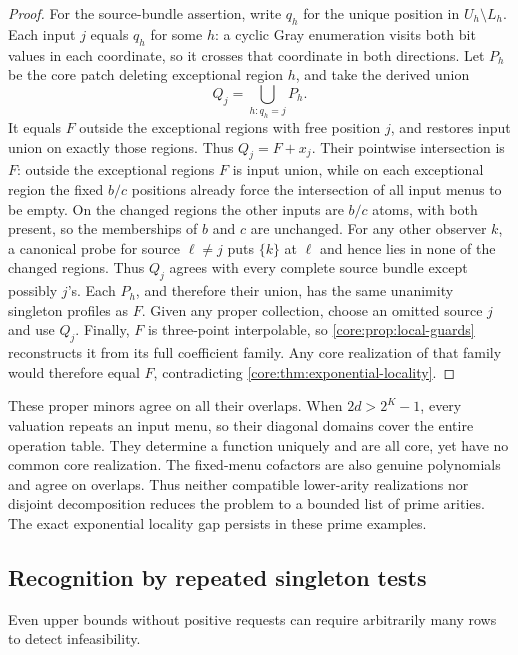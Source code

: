 \begin{proof}
For the source-bundle assertion, write $q_h$ for the unique position in
$U_h\setminus L_h$. Each input $j$ equals $q_h$ for some $h$: a cyclic
Gray enumeration visits both bit values in each coordinate, so it crosses
that coordinate in both directions. Let $P_h$ be the core patch deleting
exceptional region $h$, and take the derived union
\[
 Q_j=\bigcup_{h:q_h=j}P_h.
\]
It equals $F$ outside the exceptional regions with free position $j$,
and restores input union on exactly those regions. Thus $Q_j=F+x_j$.
Their pointwise intersection is $F$: outside the exceptional regions
$F$ is input union, while on each exceptional region the fixed $b/c$
positions already force the intersection of all input menus to be empty.
On the changed regions the
other inputs are $b/c$ atoms, with both present, so the memberships of $b$
and $c$ are unchanged. For any other observer $k$, a canonical probe for
source $\ell\ne j$ puts $\{k\}$ at $\ell$ and hence lies in none of
the changed regions. Thus $Q_j$ agrees with every complete source bundle
except possibly $j$'s. Each $P_h$, and therefore their union, has the same
unanimity singleton profiles as $F$. Given any proper collection, choose
an omitted source $j$ and use $Q_j$.
Finally, $F$ is three-point interpolable, so
\cref{core:prop:local-guards} reconstructs it from its full coefficient
family. Any core realization of that family would therefore equal $F$,
contradicting \cref{core:thm:exponential-locality}.
\end{proof}

These proper minors agree on all their overlaps. When $2d>2^K-1$, every
valuation repeats an input menu, so their diagonal domains cover the
entire operation table. They determine a function uniquely and are all
core, yet have no common core realization. The fixed-menu cofactors are
also genuine polynomials and agree on overlaps. Thus neither compatible
lower-arity realizations nor disjoint decomposition reduces the problem
to a bounded list of prime arities. The exact exponential locality gap
persists in these prime examples.

\subsection{Recognition by repeated singleton tests}
\label{app:core-peeling}

Even upper bounds without positive requests can require arbitrarily many
rows to detect infeasibility.

